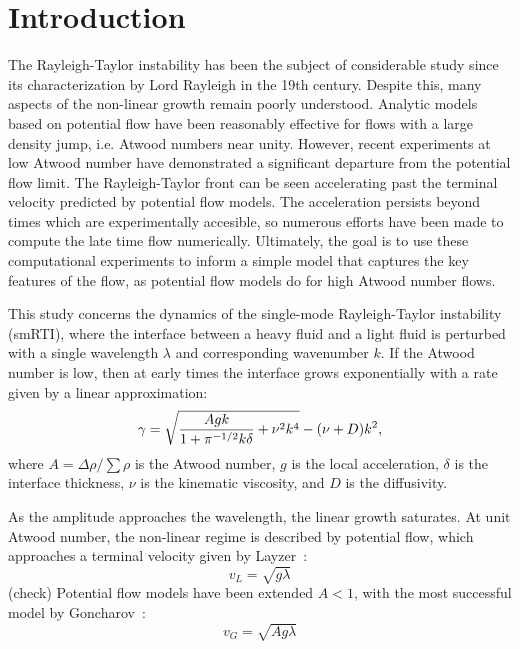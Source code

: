 \section{Introduction}

The Rayleigh-Taylor instability has been the subject of considerable study since its characterization by Lord Rayleigh in the 19th century.
Despite this, many aspects of the non-linear growth remain poorly understood.
Analytic models based on potential flow have been reasonably effective for flows with a large density jump, i.e. Atwood numbers near unity.
However, recent experiments at low Atwood number have demonstrated a significant departure from the potential flow limit.
The Rayleigh-Taylor front can be seen accelerating past the terminal velocity predicted by potential flow models.
The acceleration persists beyond times which are experimentally accesible, so numerous efforts have been made to compute the late time flow numerically.
Ultimately, the goal is to use these computational experiments to inform a simple model that captures the key features of the flow, as potential flow models do for high Atwood number flows.

This study concerns the dynamics of the single-mode Rayleigh-Taylor instability (smRTI), where the interface between a heavy fluid and a light fluid is perturbed with a single wavelength $\lambda$ and corresponding wavenumber $k$.
If the Atwood number is low, then at early times the interface grows exponentially with a rate given by a linear approximation:
\begin{equation} \elabel{duff0}
\gamma = \sqrt{\frac{A g k}{1 + \pi^{-1/2} k \delta} + \nu^2 k^4} - (\nu + D) k^2,
\end{equation}
where $A = \Delta \rho / \sum \rho$ is the Atwood number,
$g$ is the local acceleration,
$\delta$ is the interface thickness,
$\nu$ is the kinematic viscosity, and
$D$ is the diffusivity.

As the amplitude approaches the wavelength, the linear growth saturates.
At unit Atwood number, the non-linear regime is described by potential flow, which approaches a terminal velocity given by Layzer~\cite{Layzer1955}:
\begin{equation}
v_L = \sqrt{g \lambda}
\end{equation}
(check)
Potential flow models have been extended $A < 1$, with the most successful model by Goncharov~\cite{Goncharov2002}:
\begin{equation}
v_G = \sqrt{A g \lambda}
\end{equation}

